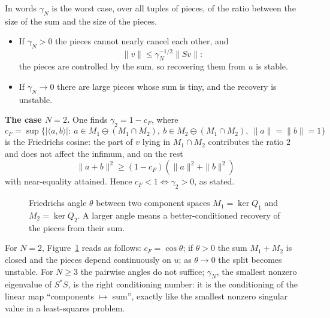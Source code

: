 \documentclass[11pt,a4paper]{article}
\theoremstyle{definition}
\begin{document}
\begin{aside}{In words}
$\gamma_N$ is the worst case, over all tuples of pieces, of the ratio between the size of the sum and the size of the pieces.
\begin{itemize}[nosep]
\item If $\gamma_N>0$ the pieces cannot nearly cancel each other, and
\[
\|v\|\le\gamma_N^{-1/2}\|Sv\|:
\]
the pieces are controlled by the sum, so recovering them from $u$ is stable.
\item If $\gamma_N\to0$ there are large pieces whose sum is tiny, and the recovery is unstable.
\end{itemize}
\textbf{The case $N=2$.} One finds $\gamma_2=1-c_F$, where
\[
c_F=\sup\{|\langle a,b\rangle|:\ a\in M_1\ominus(M_1\cap M_2),\ b\in M_2\ominus(M_1\cap M_2),\ \|a\|=\|b\|=1\}
\]
is the Friedrichs cosine: the part of $v$ lying in $M_1\cap M_2$ contributes the ratio $2$ and does not affect the infimum, and on the rest
\[
\|a+b\|^2\ge(1-c_F)(\|a\|^2+\|b\|^2)
\]
with near-equality attained. Hence $c_F<1\iff\gamma_2>0$, as stated.
\end{aside}
\begin{figure}[!htb]
\centering
{}
\caption{Friedrichs angle $\theta$ between two component spaces $M_1=\ker Q_1$ and $M_2=\ker Q_2$. A larger angle means a better-conditioned recovery of the pieces from their sum.}\label{fig:friedrichs}
\end{figure}
For $N=2$, Figure~\ref{fig:friedrichs} reads as follows: $c_F=\cos\theta$; if $\theta>0$ the sum $M_1+M_2$ is closed and the pieces depend continuously on $u$; as $\theta\to0$ the split becomes unstable. For $N\ge3$ the pairwise angles do not suffice; $\gamma_N$, the smallest nonzero eigenvalue of $S^*S$, is the right conditioning number: it is the conditioning of the linear map ``components $\mapsto$ sum'', exactly like the smallest nonzero singular value in a least-squares problem.
\end{document}
